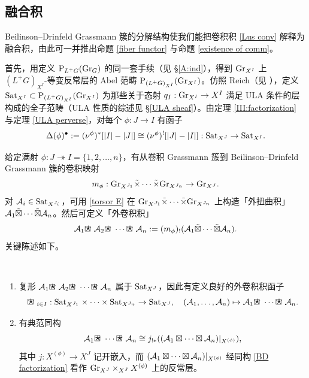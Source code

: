 
\subsection{融合积}\label{fusion}

Beilinson--Drinfeld Grassmann 簇的分解结构使我们能把卷积积 \eqref{Lus conv} 解释为融合积，由此可一并推出命题 \ref{fiber functor} 与命题 \ref{existence of comm}。

首先，用定义 $\operatorname{P}_{L^+G}({\operatorname{Gr}}_G)$ 的同一套手续（见 \S\ref{A:ind}），得到 ${\operatorname{Gr}}_{X^I}$ 上 $(L^+G)_{X^I}$-等变反常层的 Abel 范畴 $\operatorname{P}_{(L^+G)_{X^I}}({\operatorname{Gr}}_{X^I})$。仿照 Reich（见 \cite{Rei}），定义 ${\operatorname{Sat}}_{X^I}\subset \operatorname{P}_{(L^+G)_{X^I}}({\operatorname{Gr}}_{X^I})$ 为那些关于态射 $q_I:{\operatorname{Gr}}_{X^I}\to X^I$ 满足 ULA 条件的层构成的全子范畴（ULA 性质的综述见 \S\ref{ULA sheaf}）。由定理 \ref{III:factorization} 与定理 \ref{ULA perverse}，对每个 $\phi: J\to I$ 有函子
\begin{equation}\label{Sat restriction}
\Delta(\phi)^\bullet:=(\nu^\phi)^*[|I|-|J|]\cong(\nu^\phi)^![|J|-|I|]:{\operatorname{Sat}}_{X^J}\to{\operatorname{Sat}}_{X^I}.
\end{equation}

给定满射 $\phi:J\twoheadrightarrow I=\{1,2,\ldots,n\}$，有从卷积 Grassmann 簇到 Beilinson--Drinfeld Grassmann 簇的卷积映射
\[m_\phi:{\operatorname{Gr}}_{X^{J_1}}\tilde\times\cdots\tilde\times{\operatorname{Gr}}_{X^{J_n}}\to {\operatorname{Gr}}_{X^J}.\]
对 ${\mathcal A}_i\in{\operatorname{Sat}}_{X^{J_i}}$，可用 \eqref{torsor E} 在 ${\operatorname{Gr}}_{X^{J_1}}\tilde\times\cdots\tilde\times{\operatorname{Gr}}_{X^{J_n}}$ 上构造「外扭曲积」${\mathcal A}_1\tilde\boxtimes\cdots\tilde\boxtimes{\mathcal A}_n$。然后可定义「外卷积积」
\[\mA_1\boxstar \mA_2\boxstar \cdots\boxstar \mA_n:=(m_\phi)_!(\mA_1\tilde\boxtimes\cdots\tilde\boxtimes\mA_n).\]
关键陈述如下。

\begin{prop}\label{conv=fusion}~
\begin{enumerate}
\item 复形 $\mA_1\boxstar\mA_2\boxstar\cdots\boxstar\mA_n$ 属于 ${\operatorname{Sat}}_{X^{J}}$，因此有定义良好的外卷积积函子
\[\boxstar_{i\in I}:\Sat_{X^{J_1}}\times\cdots\times\Sat_{X^{J_n}}\to \Sat_{X^J},\quad (\mA_1,\ldots,\mA_n)\mapsto \mA_1\boxstar\cdots\boxstar\mA_n.\]

\item 有典范同构
\begin{equation}\label{eqfusion}
\mA_1\boxstar\cdots\boxstar\mA_n\cong j_{!*}((\mA_1\boxtimes\cdots\boxtimes\mA_n)|_{X^{(\phi)}}),
\end{equation}
其中 $j: X^{(\phi)}\to X^J$ 记开嵌入，而 $({\mathcal A}_1\boxtimes\cdots\boxtimes{\mathcal A}_n)|_{X^{(\phi)}}$ 经同构 \eqref{BD factorization} 看作 ${\operatorname{Gr}}_{X^J}\times_{X^J}X^{(\phi)}$ 上的反常层。
\end{enumerate}
\end{prop}

